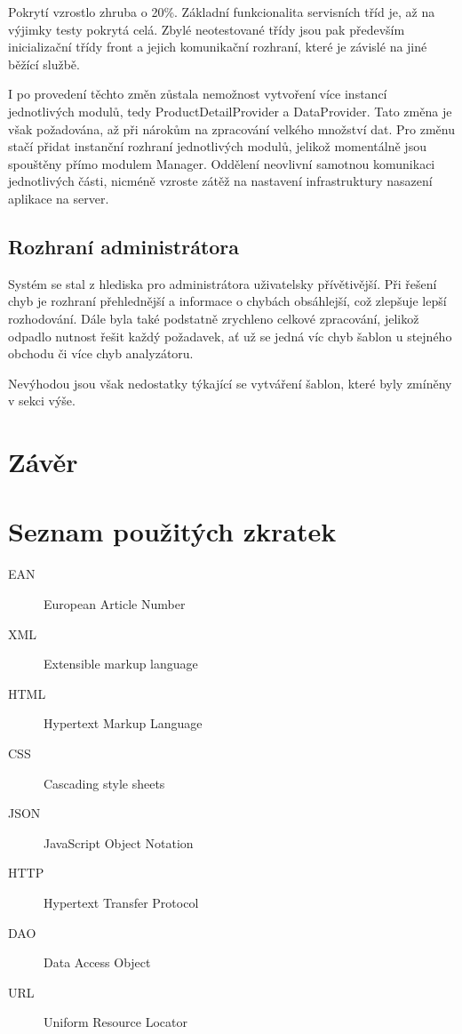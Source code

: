 \documentclass[thesis=B,czech]{FITthesis}[2012/06/26]
\begin{document}
Pokrytí vzrostlo zhruba o 20\%. Základní funkcionalita servisních tříd je, až na výjimky testy pokrytá celá.
Zbylé neotestované třídy jsou pak především inicializační třídy front a jejich komunikační rozhraní, které je závislé na jiné běžící službě.
\par
I po provedení těchto změn zůstala nemožnost vytvoření více instancí jednotlivých modulů, tedy ProductDetailProvider a DataProvider.
Tato změna je však požadována, až při nárokům na zpracování velkého množství dat. Pro změnu stačí přidat instanční rozhraní jednotlivých modulů, jelikož momentálně jsou spouštěny přímo modulem Manager. Oddělení neovlivní samotnou komunikaci jednotlivých části, nicméně 
vzroste zátěž na nastavení infrastruktury nasazení aplikace na server.

\section{Rozhraní administrátora}
Systém se stal z hlediska pro administrátora uživatelsky přívětivější. Při řešení chyb je rozhraní přehlednější a informace o chybách
obsáhlejší, což zlepšuje lepší rozhodování. Dále byla také podstatně zrychleno celkové zpracování, jelikož odpadlo nutnost řešit
každý požadavek, ať už se jedná víc chyb šablon u stejného obchodu či více chyb analyzátoru.
\par 
Nevýhodou jsou však nedostatky týkající se vytváření šablon, které byly zmíněny v sekci výše.
\chapter{Závěr}











\appendix
\chapter{Seznam použitých zkratek}
\begin{description}
	\item[EAN] European Article Number
	\item[XML] Extensible markup language
	\item[HTML] Hypertext Markup Language
	\item[CSS] Cascading style sheets
	\item[JSON] JavaScript Object Notation
	\item[HTTP] Hypertext Transfer Protocol
	\item[DAO] Data Access Object
	\item[URL] Uniform Resource Locator

\end{description}
\end{document}
